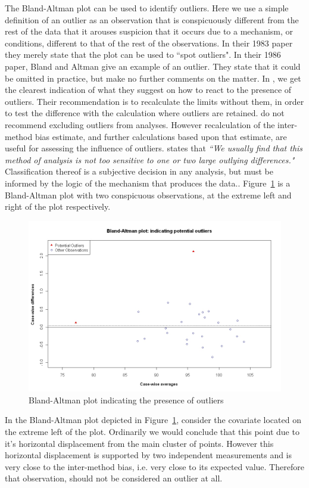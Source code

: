 \documentclass[12pt, a4paper]{report}
\theoremstyle{plain}
\theoremstyle{definition}
\theoremstyle{remark}
\begin{document}
The Bland-Altman plot can be used to identify outliers. Here  we use a simple definition of an outlier as an observation that is conspicuously different from the rest of the data that it arouses suspicion that it occurs due to a mechanism, or conditions, different to that of the rest of the observations. In their 1983 paper they merely state that the plot can be used to
``spot outliers". In their 1986 paper, Bland and Altman give an example of an
outlier. They state that it could be omitted in practice, but make
no further comments on the matter. In \citet{BA99}, we get the clearest indication of
what they suggest on how to react to the presence of
outliers. Their recommendation is to recalculate the limits
without them, in order to test the difference with the calculation
where outliers are retained. \citet*{BA99} do not recommend excluding outliers from analyses. However recalculation of the inter-method bias estimate, and further calculations based upon that estimate, are useful for assessing the influence of outliers. \citet{BA99} states that \emph{``We usually find that this method of analysis is not too sensitive to one or two large outlying differences."}
Classification thereof is a subjective decision in any analysis, but must be informed by the logic of the mechanism that produces the data.. Figure~\ref{BAOutliers} is a Bland-Altman plot with two conspicuous observations, at the extreme left and right of the
plot respectively. 
\begin{figure}[h!]
		\begin{center}
			\includegraphics[width=125mm]{images/BAOutliers.jpeg}
			\caption{Bland-Altman plot indicating the presence of outliers}\label{BAOutliers}
		\end{center}
	\end{figure}
In the Bland-Altman plot depicted in Figure~\ref{BAOutliers}, consider the covariate located on the extreme left of the plot. Ordinarily we would conclude that this point due to it's horizontal displacement from the main cluster of points. However this horizontal displacement is supported by two independent measurements and is very close to the inter-method bias, i.e. very close to its expected value. Therefore that observation, should not be considered an outlier at all.
\end{document}
